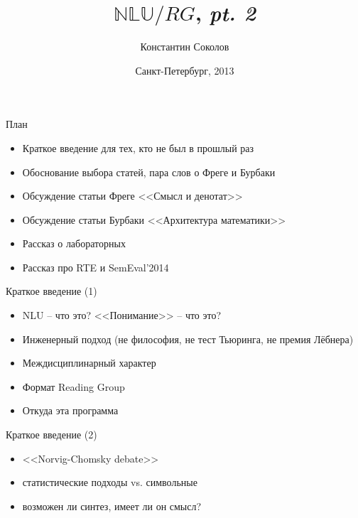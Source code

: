 \documentclass{beamer}
\begin{document}
\title{\huge{$\mathbb{NLU}/RG$, \textit{pt. 2}}}
\author{Константин Соколов}
\date{Санкт-Петербург, 2013} 
\begin{frame}
\thispagestyle{empty}
\titlepage
\end{frame}



\begin{frame}{План}
\setcounter{framenumber}{1}
\begin{itemize}
  \item Краткое введение для тех, кто не был в прошлый раз
  \item Обоснование выбора статей, пара слов о Фреге и Бурбаки
  \item Обсуждение статьи Фреге <<Смысл и денотат>>
  \item Обсуждение статьи Бурбаки <<Архитектура математики>>
  \item Рассказ о лабораторных
  \item Рассказ про RTE и SemEval'2014
\end{itemize}
\end{frame}

\begin{frame}{Краткое введение (1)}
\begin{itemize}
  \item NLU -- что это? <<Понимание>> -- что это?
  \item Инженерный подход (не философия, не тест Тьюринга, не премия Лёбнера)
  \item Междисциплинарный характер
  \item Формат Reading Group
  \item Откуда эта программа
\end{itemize}
\end{frame}

\begin{frame}{Краткое введение (2)}
\begin{itemize}
  \item <<Norvig-Chomsky debate>>
  \item статистические подходы vs. символьные
  \item возможен ли синтез, имеет ли он смысл?
\end{itemize}
\end{frame}
\end{document}
